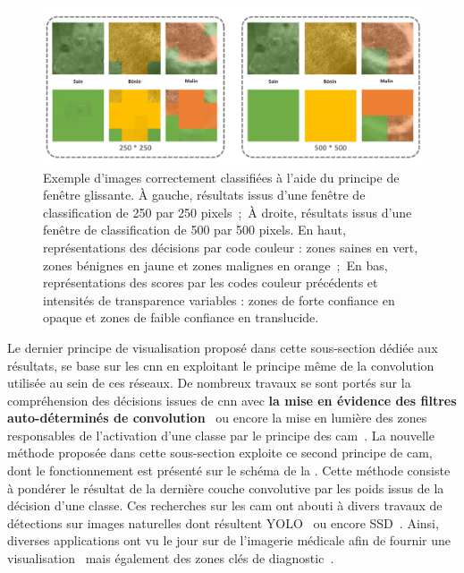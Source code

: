 \begin{figure}[H]
    \centering
    \includegraphics[width=\linewidth]{contents/chapter_6/resources/exemple_image_improvement_well.pdf}
    \caption{Exemple d'images correctement classifiées à l'aide du principe de fenêtre glissante. À gauche, résultats issus d'une fenêtre de classification de 250 par 250 pixels~;~À droite, résultats issus d'une fenêtre de classification de 500 par 500 pixels. En haut, représentations des décisions par code couleur : zones saines en vert, zones bénignes en jaune et zones malignes en orange~;~En bas, représentations des scores par les codes couleur précédents et intensités de transparence variables : zones de forte confiance en opaque et zones de faible confiance en translucide.}
    \label{fig:exemple_image_improvement_well}
\end{figure}\par

Le dernier principe de visualisation proposé dans cette sous-section dédiée aux résultats, se base sur les \gls{cnn} en exploitant le principe même de la convolution utilisée au sein de ces réseaux. De nombreux travaux se sont portés sur la compréhension des décisions issues de \gls{cnn} avec \textbf{la mise en évidence des filtres auto-déterminés de convolution}~\cite{Zeiler2014} ou encore la mise en lumière des zones responsables de l'activation d'une classe par le principe des \acrlong{cam}~\cite{Zhou2015}. La nouvelle méthode proposée dans cette sous-section exploite ce second principe de \gls{cam}, dont le fonctionnement est présenté sur le schéma de la . Cette méthode consiste à pondérer le résultat de la dernière couche convolutive par les poids issus de la décision d'une classe. Ces recherches sur les \gls{cam} ont abouti à divers travaux de détections sur images naturelles dont résultent YOLO~\cite{Redmon2016} ou encore SSD~\cite{Liu2016}. Ainsi, diverses applications ont vu le jour sur de l'imagerie médicale afin de fournir une visualisation~\cite{jia2017} mais également des zones clés de diagnostic~\cite{Park2019}.\par 
\clearpage

